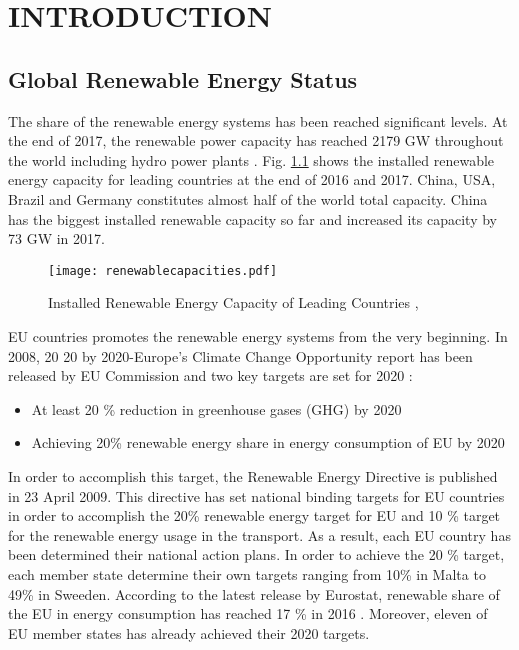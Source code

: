 \chapter{INTRODUCTION}
\label{chp:1}
\section{Global Renewable Energy Status}
The share of the renewable energy systems has been reached significant levels. At the end of 2017, the renewable power capacity has reached 2179 GW throughout the world including hydro power plants \cite{InternationalRenewableEnergyAgencyIRENA2018}. Fig. \ref{renewablecap} shows the installed renewable energy capacity for leading countries at the end of 2016 and 2017. China, USA, Brazil and Germany constitutes almost half of the world total capacity. China has the biggest installed renewable capacity so far and increased its capacity by 73 GW in 2017.\par
\begin{figure}[h]
	\centering
	\texttt{[image: renewablecapacities.pdf]}
	\caption{Installed Renewable Energy Capacity of Leading Countries \cite{InternationalRenewableEnergyAgencyIRENA2018},\cite{InternationalRenewableEnergyAgency2017}}
	\label{renewablecap}
\end{figure}
EU countries promotes the renewable energy systems from the very beginning. In 2008, 20 20 by 2020-Europe's Climate Change Opportunity report has been released by EU Commission and two key targets are set for 2020 \cite{EuropeanCommission2008}: 
\begin{itemize}  
	\item At least 20 \% reduction in greenhouse gases (GHG) by 2020
	\item Achieving 20\% renewable energy share in energy consumption of EU by 2020
\end{itemize}
In order to accomplish this target, the Renewable Energy Directive is published in 23 April 2009. This directive has set national binding targets for EU countries in order to accomplish the 20\% renewable energy target for EU and 10 \% target for the renewable energy usage in the transport. \cite{EuropeanParliament2009} As a result, each EU country has been determined their national action plans. In order to achieve the 20 \% target, each member state determine their own targets ranging from 10\% in Malta to 49\% in Sweeden. According to the latest release by Eurostat, renewable share of the EU in energy consumption has reached 17 \% in 2016 \cite{States2016}. Moreover, eleven of EU member states has already achieved their 2020 targets.\par
